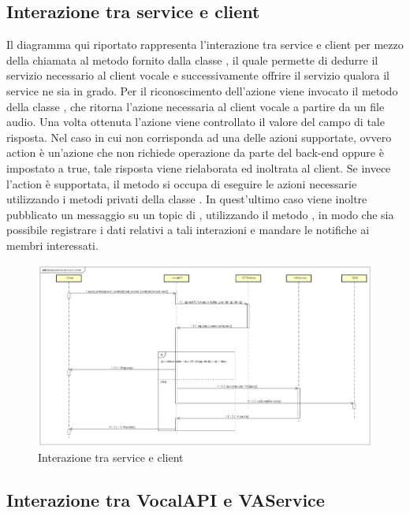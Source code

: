 \subsection{Interazione tra service e client}
Il diagramma qui riportato rappresenta l'interazione tra service e client per mezzo della chiamata al metodo  fornito dalla classe , il quale permette di dedurre il servizio necessario al client vocale e successivamente offrire il servizio qualora il service ne sia in grado. Per il riconoscimento dell'azione viene invocato il metodo  della classe , che ritorna l'azione necessaria al client vocale a partire da un file audio. Una volta ottenuta l'azione viene controllato il valore del campo  di tale risposta. Nel caso in cui  non corrisponda ad una delle azioni supportate, ovvero action è un'azione che non richiede operazione da parte del back-end oppure  è impostato a true, tale risposta viene rielaborata ed inoltrata al client. Se invece l'action è supportata, il metodo si occupa di eseguire le azioni necessarie utilizzando i metodi privati della classe . In quest'ultimo caso viene inoltre pubblicato un messaggio su un topic di , utilizzando il metodo , in modo che sia possibile registrare i dati relativi a tali interazioni e mandare le notifiche ai membri interessati. 
 \begin{figure}[h]
  \centering
  \includegraphics[width=\textwidth,height=\textheight,keepaspectratio]{images/diagrams/back-end/Ufficial_Backend/Interazionetraserviceeclient.png}
 \caption{Interazione tra service e client}
\end{figure}
\newpage
\hypertarget{interazioneVocalAPIVAService}{\subsection{Interazione tra VocalAPI e VAService}}
